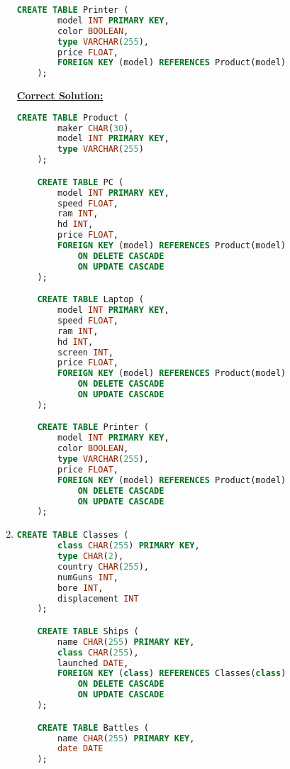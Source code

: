 \documentclass[12pt]{article}
\begin{document}
\begin{enumerate}[1.]
\begin{lstlisting}[language=SQL]
    CREATE TABLE Printer (
        model INT PRIMARY KEY,
        color BOOLEAN,
        type VARCHAR(255),
        price FLOAT,
        FOREIGN KEY (model) REFERENCES Product(model)
    );

    \end{lstlisting}

    \bigskip

    \begin{mdframed}
        \underline{\textbf{Correct Solution:}}

        \bigskip

    \begin{lstlisting}[language=SQL]
    CREATE TABLE Product (
        maker CHAR(30),
        model INT PRIMARY KEY,
        type VARCHAR(255)
    );

    CREATE TABLE PC (
        model INT PRIMARY KEY,
        speed FLOAT,
        ram INT,
        hd INT,
        price FLOAT,
        FOREIGN KEY (model) REFERENCES Product(model)
            ON DELETE CASCADE
            ON UPDATE CASCADE
    );

    CREATE TABLE Laptop (
        model INT PRIMARY KEY,
        speed FLOAT,
        ram INT,
        hd INT,
        screen INT,
        price FLOAT,
        FOREIGN KEY (model) REFERENCES Product(model)
            ON DELETE CASCADE
            ON UPDATE CASCADE
    );

    CREATE TABLE Printer (
        model INT PRIMARY KEY,
        color BOOLEAN,
        type VARCHAR(255),
        price FLOAT,
        FOREIGN KEY (model) REFERENCES Product(model)
            ON DELETE CASCADE
            ON UPDATE CASCADE
    );

    \end{lstlisting}


    \end{mdframed}

    \item

    \begin{lstlisting}[language=SQL]
    CREATE TABLE Classes (
        class CHAR(255) PRIMARY KEY,
        type CHAR(2),
        country CHAR(255),
        numGuns INT,
        bore INT,
        displacement INT
    );

    CREATE TABLE Ships (
        name CHAR(255) PRIMARY KEY,
        class CHAR(255),
        launched DATE,
        FOREIGN KEY (class) REFERENCES Classes(class)
            ON DELETE CASCADE
            ON UPDATE CASCADE
    );

    CREATE TABLE Battles (
        name CHAR(255) PRIMARY KEY,
        date DATE
    );


\end{lstlisting}
\end{enumerate}
\end{document}
